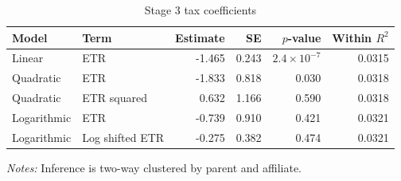 \begin{table}[H]
\centering
\footnotesize
\setlength{\tabcolsep}{3pt}
\caption{Stage 3 tax coefficients}
\label{tab:app_stage3_tax_coefficients}
\begin{tabular}{@{}llrrrr@{}}
\toprule
Model & Term & Estimate & SE & $p$-value & Within $R^2$ \\
\midrule
Linear & ETR & -1.465 & 0.243 & $2.4 \times 10^{-7}$ & 0.0315 \\
Quadratic & ETR & -1.833 & 0.818 & 0.030 & 0.0318 \\
Quadratic & ETR squared &  0.632 & 1.166 & 0.590 & 0.0318 \\
Logarithmic & ETR & -0.739 & 0.910 & 0.421 & 0.0321 \\
Logarithmic & Log shifted ETR & -0.275 & 0.382 & 0.474 & 0.0321 \\
\bottomrule
\end{tabular}

\vspace{0.35em}
\noindent\begin{minipage}{\textwidth}
\footnotesize\raggedright\textit{Notes:} Inference is two-way clustered by parent and affiliate.
\end{minipage}
\end{table}
